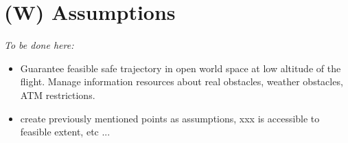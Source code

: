 \section{(W) Assumptions}\label{s:assumptions}
    \emph{To be done here:}
    \begin{itemize}
        \item  Guarantee feasible safe trajectory in open world space at low altitude of the flight. Manage information resources about real obstacles, weather obstacles, ATM restrictions.
        \item create previously mentioned points as assumptions, xxx is accessible to feasible extent, etc ...
    \end{itemize}